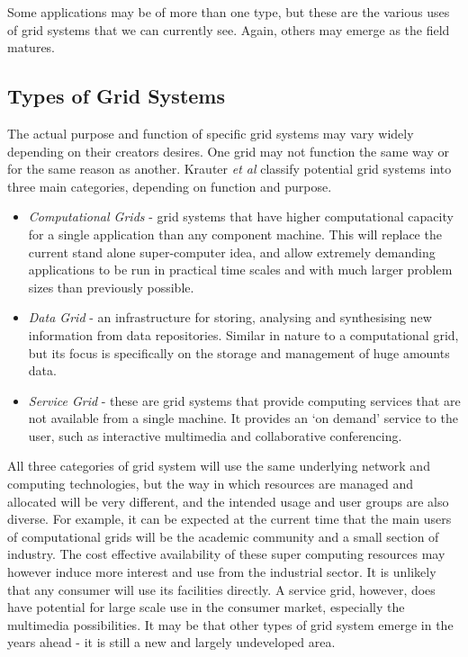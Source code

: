 Some applications may be of more than one type, but these are the various
uses of grid systems that we can currently see.  Again, others may emerge as
the field matures.

\subsection{Types of Grid Systems}

The actual purpose and function of specific grid systems may vary widely
depending on their creators desires.  One grid may not function the same way or
for the same reason as another. Krauter \textit{et al}
\cite{grid-krauter02-taxonomy} classify potential grid systems into three main
categories, depending on function and purpose.

\begin{itemize}

  \item{\emph{Computational Grids}} - grid systems that have higher
    computational capacity for a single application than any component machine.
    This will replace the current stand alone super-computer idea, and allow
    extremely demanding applications to be run in practical time scales and
    with much larger problem sizes than previously possible.

  \item{\emph{Data Grid}} - an infrastructure for storing, analysing and
    synthesising new information from data repositories.  Similar in nature to
    a computational grid, but its focus is specifically on the storage and
    management of huge amounts data.

  \item{\emph{Service Grid}} - these are grid systems that provide computing
    services that are not available from a single machine.  It provides an `on
    demand' service to the user, such as interactive multimedia and
    collaborative conferencing.

\end{itemize}

All three categories of grid system will use the same underlying network and
computing technologies, but the way in which resources are managed and
allocated will be very different, and the intended usage and user groups are
also diverse.  For example, it can be expected at the current time that the
main users of computational grids will be the academic community and a small
section of industry.  The cost effective availability of these super computing
resources may however induce more interest and use from the industrial sector.
It is unlikely that any consumer will use its facilities directly. A service
grid, however, does have potential for large scale use in the consumer market,
especially the multimedia possibilities. It may be that other types of grid
system emerge in the years ahead - it is still a new and largely undeveloped
area.

